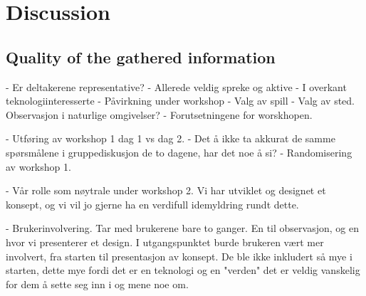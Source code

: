 \chapter{Discussion}

\section{Quality of the gathered information}
- Er deltakerene representative?
	- Allerede veldig spreke og aktive
	- I overkant teknologiinteresserte
- Påvirkning under workshop
- Valg av spill
- Valg av sted. Observasjon i naturlige omgivelser?
- Forutsetningene for worskhopen. 

- Utføring av workshop 1 dag 1 vs dag 2.
- Det å ikke ta akkurat de samme spørsmålene i gruppediskusjon de to dagene, har det noe å si?
- Randomisering av workshop 1. 

- Vår rolle som nøytrale under workshop 2. Vi har utviklet og designet et konsept, og vi vil jo gjerne ha en verdifull idemyldring rundt dette.  

- Brukerinvolvering. Tar med brukerene bare to ganger. En til observasjon, og en hvor vi presenterer et design. I utgangspunktet burde brukeren vært mer involvert, fra starten til presentasjon av konsept. De ble ikke inkludert så mye i starten, dette mye fordi det er en teknologi og en "verden" det er veldig vanskelig for dem å sette seg inn i og mene noe om. 